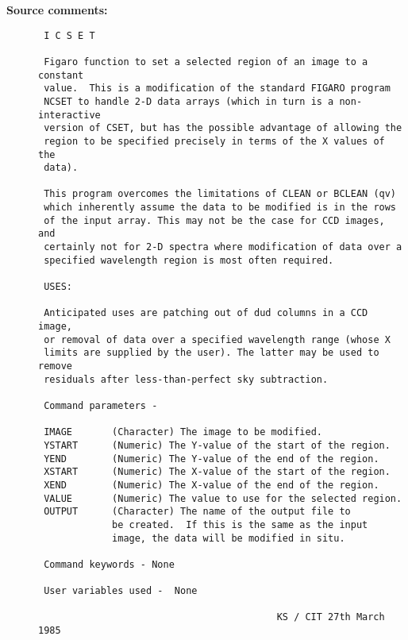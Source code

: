 \begin{description}
\item [{\bf Source comments:}]
\begin{verbatim}
 I C S E T

 Figaro function to set a selected region of an image to a constant
 value.  This is a modification of the standard FIGARO program
 NCSET to handle 2-D data arrays (which in turn is a non-interactive
 version of CSET, but has the possible advantage of allowing the
 region to be specified precisely in terms of the X values of the
 data).

 This program overcomes the limitations of CLEAN or BCLEAN (qv)
 which inherently assume the data to be modified is in the rows
 of the input array. This may not be the case for CCD images, and
 certainly not for 2-D spectra where modification of data over a
 specified wavelength region is most often required.

 USES:

 Anticipated uses are patching out of dud columns in a CCD image,
 or removal of data over a specified wavelength range (whose X
 limits are supplied by the user). The latter may be used to remove
 residuals after less-than-perfect sky subtraction.

 Command parameters -

 IMAGE       (Character) The image to be modified.
 YSTART      (Numeric) The Y-value of the start of the region.
 YEND        (Numeric) The Y-value of the end of the region.
 XSTART      (Numeric) The X-value of the start of the region.
 XEND        (Numeric) The X-value of the end of the region.
 VALUE       (Numeric) The value to use for the selected region.
 OUTPUT      (Character) The name of the output file to
             be created.  If this is the same as the input
             image, the data will be modified in situ.

 Command keywords - None

 User variables used -  None

                                          KS / CIT 27th March 1985
\end{verbatim}
\end{description}
